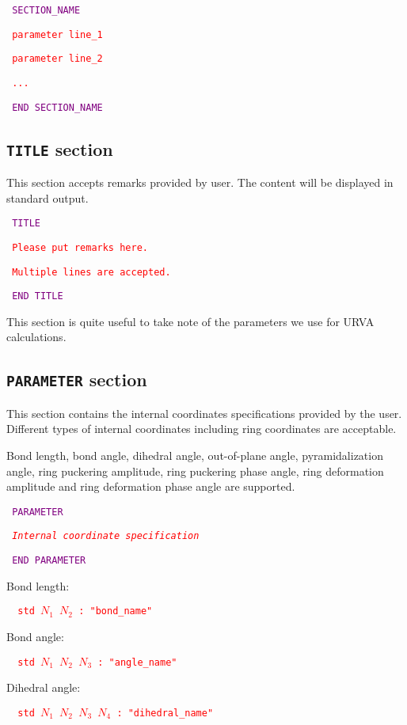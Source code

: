 \texttt{
\textcolor{Purple}{SECTION\_NAME}}

\texttt{
\textcolor{red}{parameter line\_1}}

\texttt{
\textcolor{red}{parameter line\_2}}

\texttt{
\textcolor{red}{...}}

\texttt{
\textcolor{Purple}{END SECTION\_NAME}}


\subsection{\texttt{TITLE} section  }
This section accepts remarks provided by user. The content will be displayed in standard output.

\texttt{
\textcolor{Purple}{TITLE}}

\texttt{
\textcolor{red}{Please put remarks here.}}

\texttt{
\textcolor{red}{Multiple lines are accepted.}}

\texttt{
\textcolor{Purple}{END TITLE}}

This section is quite useful to take note of the parameters we use for URVA calculations.



\subsection{\texttt{PARAMETER} section }
This section contains the internal coordinates specifications provided by the user. Different types of internal coordinates including ring coordinates are acceptable.

Bond length, bond angle, dihedral angle, out-of-plane angle, pyramidalization angle, ring puckering amplitude, ring puckering phase angle, ring deformation amplitude and ring deformation phase angle are supported.   


\texttt{
\textcolor{Purple}{PARAMETER}}

\texttt{
\textcolor{red}{\textit{Internal coordinate specification}}}

\texttt{
\textcolor{Purple}{END PARAMETER}}

Bond length:

\texttt{
\textcolor{red}{
std $N_1$ $N_2$ : "bond\_name"
}}

Bond angle:

\texttt{
\textcolor{red}{
std $N_1$ $N_2$ $N_3$ : "angle\_name"
}}

Dihedral angle:

\texttt{
\textcolor{red}{
std $N_1$ $N_2$ $N_3$ $N_4$ : "dihedral\_name"
}}

